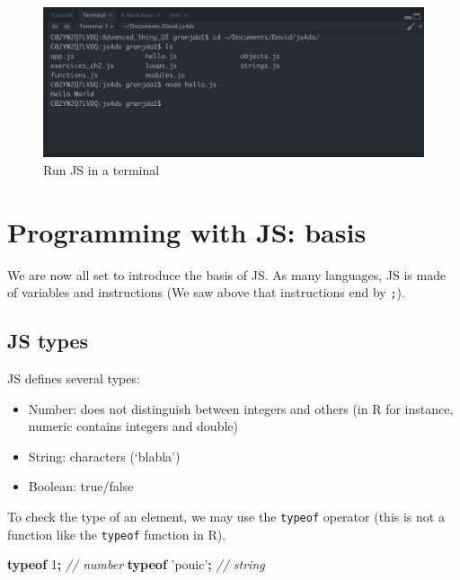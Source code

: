 \documentclass[]{book}
\newenvironment{Shaded}{\begin{snugshade}}{\end{snugshade}}
\newcommand{\CommentTok}[1]{\textcolor[rgb]{0.56,0.35,0.01}{\textit{#1}}}
\newcommand{\DecValTok}[1]{\textcolor[rgb]{0.00,0.00,0.81}{#1}}
\newcommand{\KeywordTok}[1]{\textcolor[rgb]{0.13,0.29,0.53}{\textbf{#1}}}
\newcommand{\OperatorTok}[1]{\textcolor[rgb]{0.81,0.36,0.00}{\textbf{#1}}}
\newcommand{\StringTok}[1]{\textcolor[rgb]{0.31,0.60,0.02}{#1}}
\providecommand{\tightlist}{%
  \setlength{\itemsep}{0pt}\setlength{\parskip}{0pt}}
\begin{document}
\begin{figure}
\includegraphics[width=26.75in]{images/survival-kit/script-rstudio} \caption{Run JS in a terminal}\label{fig:script-rstudio}
\end{figure}

\hypertarget{programming-with-js-basis}{%
\section{Programming with JS: basis}\label{programming-with-js-basis}}

We are now all set to introduce the basis of JS. As many languages, JS is made of variables and instructions (We saw above that instructions end by \texttt{;}).

\hypertarget{js-types}{%
\subsection{JS types}\label{js-types}}

JS defines several types:

\begin{itemize}
\tightlist
\item
  Number: does not distinguish between integers and others (in R for instance, numeric contains integers and double)
\item
  String: characters (`blabla')
\item
  Boolean: true/false
\end{itemize}

To check the type of an element, we may use the \texttt{typeof} operator (this is not a function like the \texttt{typeof} function in R).

\begin{Shaded}
\begin{Highlighting}[]
\KeywordTok{typeof} \DecValTok{1}\OperatorTok{;} \CommentTok{// number}
\KeywordTok{typeof} \StringTok{'pouic'}\OperatorTok{;} \CommentTok{// string}
\end{Highlighting}
\end{Shaded}
\end{document}
